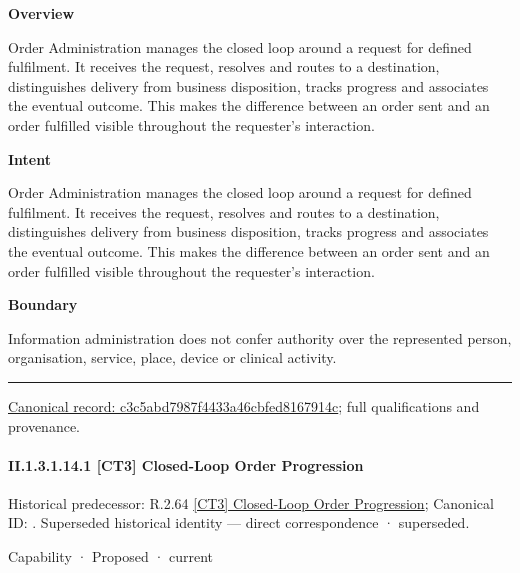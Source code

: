 \textbf{Overview}



Order Administration manages the closed loop around a request for defined fulfilment. It receives the request, resolves and routes to a destination, distinguishes delivery from business disposition, tracks progress and associates the eventual outcome. This makes the difference between an order sent and an order fulfilled visible throughout the requester's interaction.



\textbf{Intent}



Order Administration manages the closed loop around a request for defined fulfilment. It receives the request, resolves and routes to a destination, distinguishes delivery from business disposition, tracks progress and associates the eventual outcome. This makes the difference between an order sent and an order fulfilled visible throughout the requester's interaction.



\textbf{Boundary}



Information administration does not confer authority over the represented person, organisation, service, place, device or clinical activity.



\medskip\hrule\medskip

{\footnotesize \href{../../../../continuum/strategy/capability/c3c5abd7987f4433a46cbfed8167914c.md}{Canonical record: c3c5abd7987f4433a46cbfed8167914c}; full qualifications and provenance.}\par
\paragraph*{II.1.3.1.14.1 [CT3] Closed-Loop Order Progression}
\label{navigation:II.1.3.1.14.1}

{\small Historical predecessor: R.2.64 \hyperref[element:2ad29cebc1e94053a300d869e7797232]{[CT3] Closed-Loop Order Progression}; Canonical ID: \texttt{}. Superseded historical identity — direct correspondence · superseded.}\par
\label{element:2f79ebd7392c46ef92def6f25bc9c7ce}
{\small Capability · Proposed · current}\par

